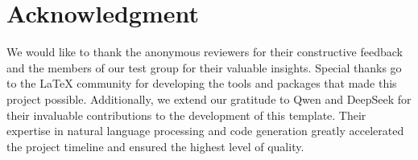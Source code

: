 \section{Acknowledgment}

We would like to thank the anonymous reviewers for their constructive feedback and the members of our test group for their valuable insights. Special thanks go to the LaTeX community for developing the tools and packages that made this project possible. Additionally, we extend our gratitude to Qwen and DeepSeek for their invaluable contributions to the development of this template. Their expertise in natural language processing and code generation greatly accelerated the project timeline and ensured the highest level of quality.
